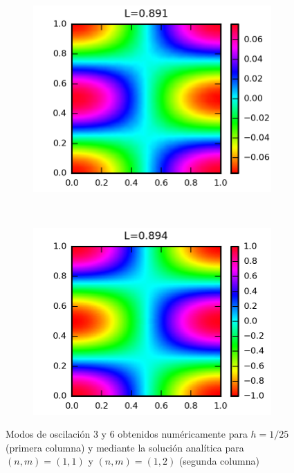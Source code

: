 \begin{figure}
  
  \begin{subfigure}{0.4\textwidth}
    \centering
    \includegraphics{figuras/modonum_6.png}
  \end{subfigure}
  ~
  \begin{subfigure}{0.4\textwidth}
    \centering
    \includegraphics{figuras/modoanalitico_1_2.png}
  \end{subfigure}
  
  \label{fig:modos_numericovsanalitico}
  \caption{Modos de oscilaci\'on 3 y 6 obtenidos num\'ericamente para $h=1/25$ (primera columna) y mediante la soluci\'on anal\'itica para $(n,m)=(1,1)$ y $(n,m)=(1,2)$ (segunda columna)}
\end{figure}

